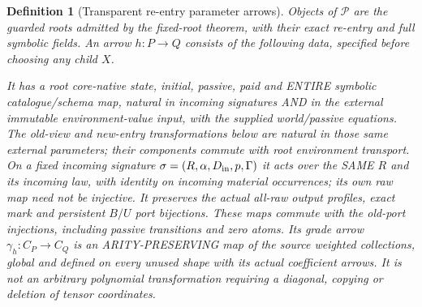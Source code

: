 \documentclass[11pt]{article}
\newtheorem{definition}{Definition}\newtheorem{theorem}{Theorem}\newtheorem{proposition}{Proposition}
\begin{document}
\begin{definition}[Transparent re-entry parameter arrows]
Objects of $\mathcal P$ are the guarded roots admitted by the fixed-root theorem, with their exact re-entry and full symbolic fields. An arrow $h:P\to Q$ consists of the following data, specified before choosing any child $X$.

It has a root core-native state, initial, passive, paid and ENTIRE symbolic catalogue/schema map, natural in incoming signatures AND in the external immutable environment-value input, with the supplied world/passive equations. The old-view and new-entry transformations below are natural in those same external parameters; their components commute with root environment transport. On a fixed incoming signature $\sigma=(R,\alpha,D_{\rm in},p,\Gamma)$ it acts over the SAME $R$ and its incoming law, with identity on incoming material occurrences; its own raw map need not be injective. It preserves the actual all-raw output profiles, exact mark and persistent $B/U$ port bijections. These maps commute with the old-port injections, including passive transitions and zero atoms. Its grade arrow $\gamma_h:C_P\to C_Q$ is an ARITY-PRESERVING map of the source weighted collections, global and defined on every unused shape with its actual coefficient arrows. It is not an arbitrary polynomial transformation requiring a diagonal, copying or deletion of tensor coordinates.


\end{definition}
\end{document}

